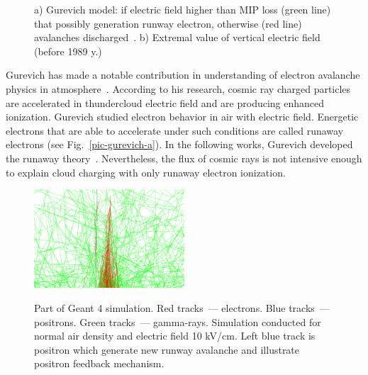 \documentclass[utf8]{webofc}
\begin{document}
\begin{figure}[ht!]
\begin{subfigure}[b]{0.5\textwidth}
            \caption{}
            \label{pic-field-b}
        \end{subfigure}
        \caption{
            a) Gurevich model: if electric field higher than MIP loss (green line) that possibly generation runway electron, otherwise (red line) avalanches discharged~\cite{gurevich1992runaway}.
            b) Extremal value of vertical electric field (before 1989 y.)~\cite{mazin1989clouds}}
    \end{figure}
    
    Gurevich has made a notable contribution in understanding of electron avalanche physics in atmosphere~\cite{gurevich1992runaway}. According to his research, cosmic ray charged particles are accelerated in thundercloud electric field and are producing enhanced ionization. Gurevich studied electron behavior in air with electric field. Energetic electrons that are able to accelerate under such conditions are called runaway electrons (see Fig.~\ref{pic-gurevich-a}). In the following works, Gurevich developed the runaway theory~\cite{gurevich1999lightning,gurevich2001kinetic}. Nevertheless, the flux of cosmic rays is not intensive enough to explain cloud charging with only runaway electron ionization.
    \begin{figure}[t]
        \centering
        \includegraphics[width=0.5\textwidth]{pictures/10_dwyer}
        \label{pic-dwyer-a}
        
        
        \caption{Part of Geant 4 simulation. Red tracks~--- electrons. Blue tracks~--- positrons. Green tracks~--- gamma-rays. Simulation conducted for normal air density and electric field 10 kV/cm. Left blue track is positron which generate new runway avalanche and illustrate positron feedback mechanism.}    
    \end{figure}
    
\end{document}
